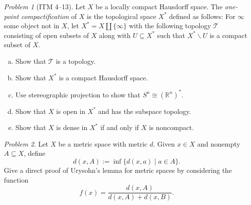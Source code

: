 \documentclass[11pt,twoside]{amsart}
\theoremstyle{plain}
\theoremstyle{remark}
\newtheorem{prob}{Problem}
\theoremstyle{definition}
\theoremstyle{definition}
\newcommand{\RR}{\mathbb{R}}
\begin{document}
\begin{prob}[ITM 4--13]
Let $X$ be a locally compact Hausdorff space. The \emph{one-point compactification} of $X$ is the topological space $X^*$ defined as follows: For $\infty$ some object not in $X$, let $X^* = X\amalg \{\infty\}$ with the following topology $\mathscr T$ consisting of open subsets of $X$ along with $U\subseteq X^*$ such that $X^*\smallsetminus U$ is a compact subset of $X$.
\begin{enumerate}[(a)]
\item Show that $\mathscr T$ is a topology.
\item Show that $X^*$ is a compact Hausdorff space.
\item Use stereographic projection to show that $S^n \cong (\RR^n)^*$.
\item Show that $X$ is open in $X^*$ and has the subspace topology.
\item Show that $X$ is dense in $X^*$ if and only if $X$ is noncompact.
\end{enumerate}
\end{prob}

\begin{prob}
Let $X$ be a metric space with metric $d$. Given $x\in X$ and nonempty $A\subseteq X$, define
\[
  d(x,A) := \inf\{d(x,a)\mid a\in A\}.
\]
Give a direct proof of Urysohn's lemma for metric spaces by considering the function
\[
  f(x) = \frac{d(x,A)}{d(x,A)+d(x,B)}.
\]
\end{prob}
\end{document}

